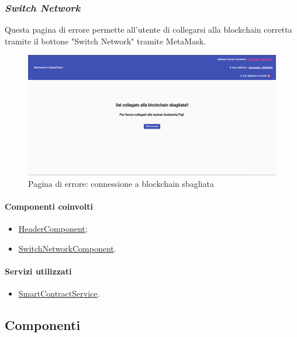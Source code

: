 \newpage

\subsubsection*{\textit{Switch Network}}
Questa pagina di errore permette all'utente di collegarsi alla blockchain corretta tramite il bottone "Switch Network" tramite MetaMask.

\begin{figure}[!h] 
    \centering 
    \includegraphics[width=1\columnwidth]{immagini/maschere/switchNetwork.png} 
    \caption{Pagina di errore: connessione a blockchain sbagliata}
\end{figure}

\paragraph{Componenti coinvolti}
\begin{itemize}
    \item \hyperref[sec:header-component]{HeaderComponent};
    \item \hyperref[sec:switch-component]{SwitchNetworkComponent}.
\end{itemize}

\paragraph{Servizi utilizzati}
\begin{itemize}
    \item \hyperref[sec:smart-contract-service]{SmartContractService}.
\end{itemize}

\newpage


\subsection{Componenti}

